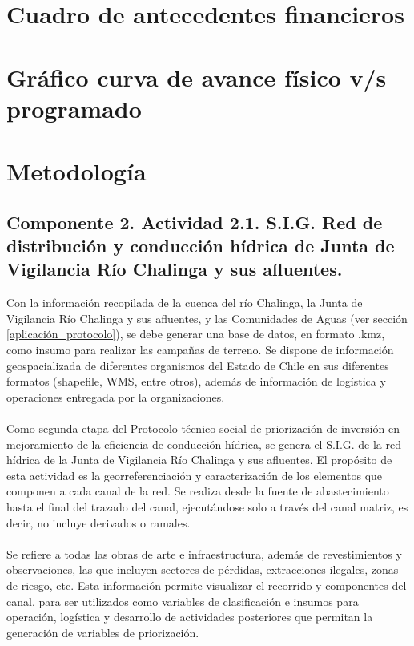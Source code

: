 \documentclass[]{article}
\begin{document}
\clearpage
\section{Cuadro de antecedentes financieros}

\clearpage
\section{Gráfico curva de avance físico v/s programado}

\clearpage
\section{Metodología}

\subsection{Componente 2. Actividad 2.1. S.I.G. Red de distribución y conducción hídrica de Junta de Vigilancia Río Chalinga y sus afluentes.}

Con la información recopilada de la cuenca del río Chalinga, la Junta de Vigilancia Río Chalinga y sus afluentes, y las Comunidades de Aguas (ver sección \ref{aplicación_protocolo}), se debe generar una base de datos, en formato .kmz, como insumo para realizar las campañas de terreno. Se dispone de información geospacializada de diferentes organismos del Estado de Chile en sus diferentes formatos (shapefile, WMS, entre otros), además de información de logística y operaciones entregada por la organizaciones. \\
\\
Como segunda etapa del Protocolo técnico-social de priorización de inversión en mejoramiento de la eficiencia de conducción hídrica, se genera el S.I.G. de la red hídrica de la Junta de Vigilancia Río Chalinga y sus afluentes. El propósito de esta actividad es la georreferenciación y caracterización de los elementos que componen a cada canal de la red. Se realiza desde la fuente de abastecimiento hasta el final del trazado del canal, ejecutándose solo a través del canal matriz, es decir, no incluye derivados o ramales. \\
\\
Se refiere a todas las obras de arte e infraestructura, además de revestimientos y observaciones, las que incluyen sectores de pérdidas, extracciones ilegales, zonas de riesgo, etc. Esta información permite visualizar el recorrido y componentes del canal, para ser utilizados como variables de clasificación e insumos para operación, logística y desarrollo de actividades posteriores que permitan la generación de variables de priorización.
\end{document}
